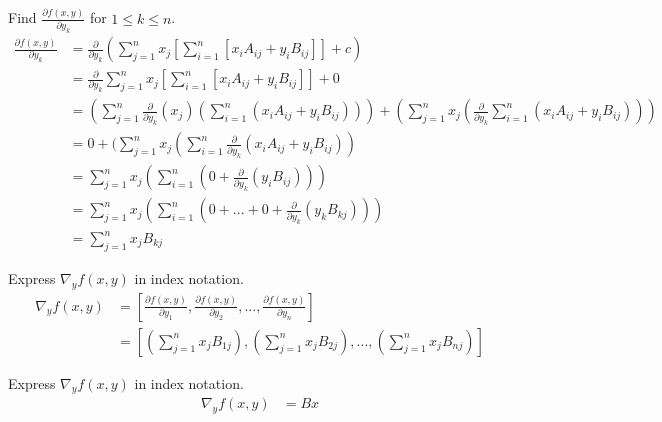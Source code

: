 \subsection{}
Find $\frac{\partial f(x, y)}{\partial y_k}$ for $1 \leq k \leq n$.
\begin{align*}
    \frac{\partial f(x, y)}{\partial y_k} &= \frac{\partial}{\partial y_k} (\sum_{j=1}^n x_j [\sum_{i=1}^n [x_i A_{ij} + y_i B_{ij}]] + c) \\
	&= \frac{\partial}{\partial y_k} \sum_{j=1}^n x_j [\sum_{i=1}^n [x_i A_{ij} + y_i B_{ij}]] + 0 \\
	&= (\sum_{j=1}^n \frac{\partial}{\partial y_k} (x_j) (\sum_{i=1}^n (x_i A_{ij} + y_i B_{ij}))) + (\sum_{j=1}^n x_j (\frac{\partial}{\partial y_k} \sum_{i=1}^n (x_i A_{ij} + y_i B_{ij}))) \\
	&= 0 + (\sum_{j=1}^n x_j  (\sum_{i=1}^n \frac{\partial}{\partial y_k} (x_i A_{ij} + y_i B_{ij})) \\
	&= \sum_{j=1}^n x_j (\sum_{i=1}^n (0 + \frac{\partial}{\partial y_k} (y_i B_{ij}))) \\
	&= \sum_{j=1}^n x_j (\sum_{i=1}^n (0 + ... + 0 + \frac{\partial}{\partial y_k} (y_k B_{kj}))) \\ 
	&= \sum_{j=1}^n x_j B_{kj} 
\end{align*}

Express $\nabla_y f(x, y)$ in index notation.
\begin{align*}
    \nabla_y f(x, y) &= [\frac{\partial f(x, y)}{\partial y_1} , \frac{\partial f(x, y)}{\partial y_2}, ... , \frac{\partial f(x, y)}{\partial y_n}] \\
	&= [(\sum_{j=1}^n x_j B_{1j}) , (\sum_{j=1}^n x_j B_{2j}), ... , (\sum_{j=1}^n x_j B_{nj})]
\end{align*}

Express $\nabla_y f(x, y)$ in index notation.
\begin{align*}
    \nabla_y f(x, y) &= Bx
\end{align*}



